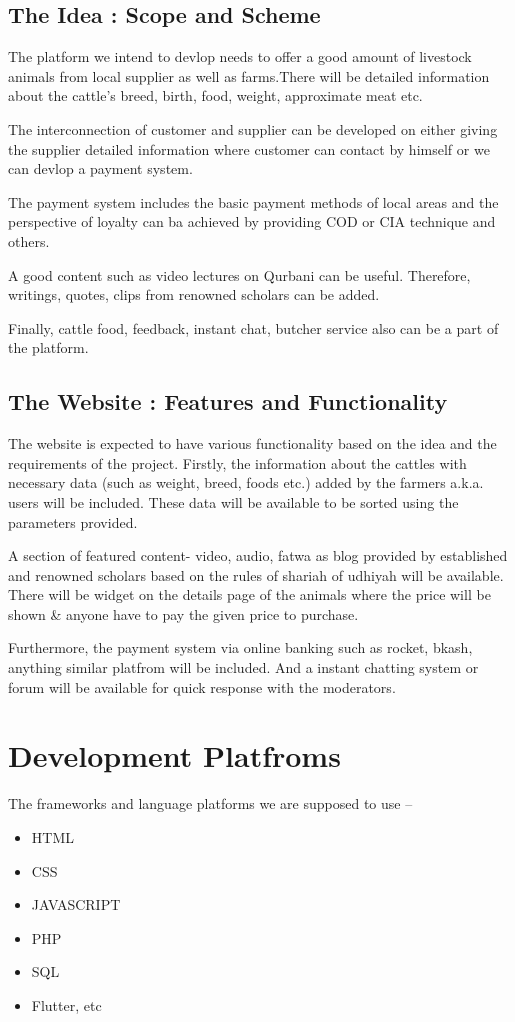 \documentclass[a4paper,12pt]{report}
\begin{document}
\subsection*{The Idea : Scope and Scheme}
The platform we intend to devlop needs to offer a good amount of  livestock animals from local supplier as well as farms.There will be detailed information about the cattle's breed, birth, food, weight, approximate meat etc.

The interconnection of customer and supplier can be developed on either giving the supplier detailed information where customer can contact by himself or we can devlop a payment system.


The payment system includes the basic payment methods of local areas and the perspective of loyalty can ba achieved by providing COD or CIA technique and others.

A good content such as video lectures on Qurbani can be useful. Therefore, writings, quotes, clips from renowned scholars can be added.

Finally, cattle food, feedback, instant chat, butcher service also can be a part of the platform.

\subsection*{The Website : Features and Functionality}

The website is expected to have various functionality based on the idea and the requirements of the project. Firstly, the information about the cattles with necessary data (such as weight, breed, foods etc.) added by the farmers a.k.a. users will be included. These data will be available to be sorted using the parameters provided.

A section of featured content- video, audio, fatwa as blog provided by established and renowned scholars based on the rules of shariah of udhiyah will be available.
There will be widget on the details page of the animals where the price will be shown \& anyone have to pay the given price to purchase.%

Furthermore, the payment system via online banking such as rocket, bkash, anything similar platfrom will be included. And a instant chatting system or forum will be available for quick response with the moderators.

\section*{Development Platfroms}
The frameworks and language platforms we are supposed to use --
\begin{itemize}
	\item HTML
	\item CSS
	\item JAVASCRIPT
	\item PHP
	\item SQL
\item Flutter, etc
\end{itemize}
\end{document}
